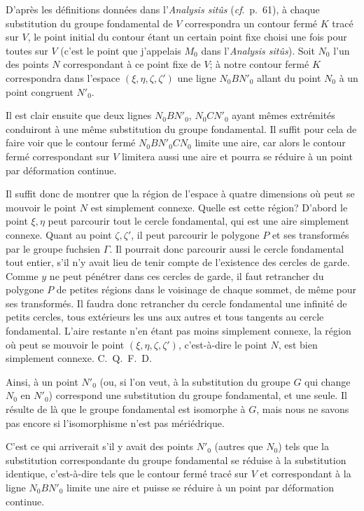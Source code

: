 \documentclass{article}
\begin{document}
D'après les définitions données dans l'\emph{Analysis sitûs} (\emph{cf}.\ p.\ 61), à chaque substitution du groupe fondamental de $V$ correspondra un contour fermé $K$ tracé sur $V$, le point initial du contour étant un certain point fixe choisi une fois pour toutes sur $V$ (c'est le point que j'appelais $M_{0}$ dans l'\emph{Analysis sitûs}). Soit $N_{0}$ l'un des points $N$ correspondant à ce point fixe de $V$; à notre contour fermé $K$ correspondra dans l'espace $(\xi, \eta, \zeta, \zeta')$ une ligne $N_{0}BN'_{0}$ allant du point $N_{0}$ à un point congruent $N'_{0}$.

Il est clair ensuite que deux lignes $N_{0}BN'_{0}$, $N_{0}CN'_{0}$ ayant mêmes extrémités conduiront à une même substitution du groupe fondamental. Il suffit pour cela de faire voir que le contour fermé $N_{0}BN'_{0}CN_{0}$ limite une aire, car alors le contour fermé correspondant sur $V$ limitera aussi une aire et pourra se réduire à un point par déformation continue.

Il suffit donc de montrer que la région de l'espace à quatre dimensions où peut se mouvoir le point $N$ est simplement connexe. Quelle est cette région? D'abord le point $\xi, \eta$ peut parcourir tout le cercle fondamental, qui est une aire simplement connexe. Quant au point $\zeta, \zeta'$, il peut parcourir le polygone $P$ et ses transformés par le groupe fuchsien $\Gamma$. Il pourrait donc parcourir aussi le cercle fondamental tout entier, s'il n'y avait lieu de tenir
compte de l'existence des cercles de garde. Comme $y$ ne peut pénétrer dans ces cercles de garde, il faut retrancher du polygone $P$ de petites régions dans le voisinage de chaque sommet, de même pour ses transformés. Il faudra donc retrancher du cercle fondamental une infinité de petits cercles, tous extérieurs les uns aux autres et tous tangents au cercle fondamental. L'aire restante n'en étant pas moins simplement connexe, la région où peut se mouvoir le point $(\xi, \eta, \zeta, \zeta')$, c'est-à-dire le point $N$, est bien simplement connexe. C.~Q.~F.~D.

Ainsi, à un point $N'_{0}$ (ou, si l'on veut, à la substitution du groupe $G$ qui change $N_{0}$ en $N'_{0}$) correspond une substitution du groupe fondamental, et une seule. Il résulte de là que le groupe fondamental est isomorphe à $G$, mais nous ne savons pas encore si l'isomorphisme n'est pas mériédrique.

C'est ce qui arriverait s'il y avait des points $N'_{0}$ (autres que $N_{0}$) tels que la substitution correspondante du groupe fondamental se réduise à la substitution identique, c'est-à-dire tels que le contour fermé tracé sur $V$ et correspondant à la ligne $N_{0}BN'_{0}$ limite une aire et puisse se réduire à un point par déformation continue.
\end{document}
